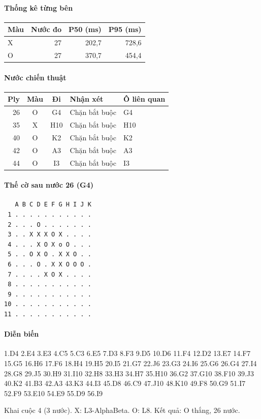 \paragraph{Thống kê từng bên}
\begin{center}\small
\begin{tabular}{@{}lrrr@{}}
\toprule
Màu & Nước đo & P50 (ms) & P95 (ms) \\
\midrule
X & 27 & 202,7 & 728,6 \\
O & 27 & 370,7 & 454,4 \\
\bottomrule
\end{tabular}
\end{center}
\paragraph{Nước chiến thuật}
\begin{center}\small
\begin{tabular}{@{}rccll@{}}
\toprule
Ply & Màu & Đi & Nhận xét & Ô liên quan \\
\midrule
26 & O & G4 & Chặn bắt buộc & G4 \\
35 & X & H10 & Chặn bắt buộc & H10 \\
40 & O & K2 & Chặn bắt buộc & K2 \\
42 & O & A3 & Chặn bắt buộc & A3 \\
44 & O & I3 & Chặn bắt buộc & I3 \\
\bottomrule
\end{tabular}
\end{center}
\paragraph{Thế cờ sau nước 26 (G4)}
\begin{verbatim}
   A B C D E F G H I J K
 1 . . . . . . . . . . .
 2 . . . O . . . . . . .
 3 . . X X X O X . . . .
 4 . . . X O X o O . . .
 5 . . O X O . X X O . .
 6 . . . O . X X O O O .
 7 . . . . X O X . . . .
 8 . . . . . . . . . . .
 9 . . . . . . . . . . .
10 . . . . . . . . . . .
11 . . . . . . . . . . .
\end{verbatim}
\paragraph{Diễn biến}
{\footnotesize 1.D4 2.E4 3.E3 4.C5 5.C3 6.E5 7.D3 8.F3 9.D5 10.D6 11.F4 12.D2 13.E7 14.F7 15.G5 16.H6 17.F6 18.H4 19.H5 20.I5 21.G7 22.J6 23.G3 24.I6 25.G6 26.G4 27.I4 28.G8 29.J5 30.H9 31.I10 32.H8 33.H3 34.H7 35.H10 36.G2 37.G10 38.F10 39.J3 40.K2 41.B3 42.A3 43.K3 44.I3 45.D8 46.C9 47.J10 48.K10 49.F8 50.G9 51.I7 52.F9 53.E10 54.E9 55.D9 56.I9\par}
Khai cuộc 4 (3 nước). X: L3-AlphaBeta. O: L8. Kết quả: O thắng, 26 nước.
